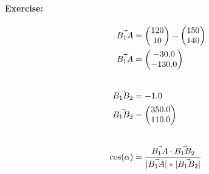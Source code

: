 \documentclass{article}
\begin{document}
\paragraph{Exercise:} 
\begin{align*}
    \vec{B_1A} &= \vA - \vBOne \\
    \vec{B_1A} &= \vBOneA  \\[20pt]
    \vec{B_1B_2} &= \pgfmathparse{1 - 2} \pgfmathresult \\
    \vec{B_1B_2} &= \vBOneBTwo \\[20pt]
    \cos(\alpha) &= \frac{\vec{B_1A} \cdot \vec{B_1B_2}}{|\vec{B_1A}| * |\vec{B_1B_2}|}
\end{align*}
\end{document}
